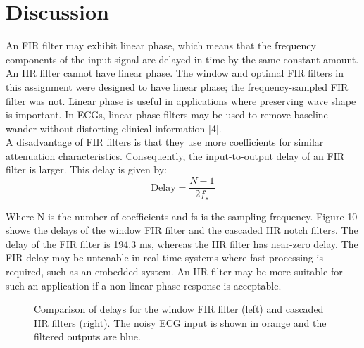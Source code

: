 \documentclass[12pt]{article}
\begin{document}
\section{Discussion}
An FIR filter may exhibit linear phase, which means that the frequency components of the input signal are delayed 
in time by the same constant amount. An IIR filter cannot have linear phase. The window and optimal FIR filters
in this assignment were designed to have linear phase; the frequency-sampled FIR filter was not. Linear phase is
useful in applications where preserving wave shape is important. In ECGs, linear phase filters may be used to remove
baseline wander without distorting clinical information [4].\\

\noindent A disadvantage of FIR filters is that they use more coefficients for similar attenuation characteristics.
Consequently, the input-to-output delay of an FIR filter is larger. This delay is given by:
\begin{equation}
    \textrm{Delay} = \frac{N-1}{2f_s}
\end{equation}

\noindent Where N is the number of coefficients and fs is the sampling frequency. Figure 10 shows the delays of the window
FIR filter and the cascaded IIR notch filters. The delay of the FIR filter is 194.3 ms, whereas the IIR filter has
near-zero delay. The FIR delay may be untenable in real-time systems where fast processing is required, such as an
embedded system. An IIR filter may be more suitable for such an application if a non-linear phase response is acceptable.\\

\begin{figure}[H]
    \begin{subfigure}{0.5\textwidth}
        \resizebox{\linewidth}{!}{}
    \end{subfigure}
    \begin{subfigure}{0.5\textwidth}
        \resizebox{\linewidth}{!}{}
    \end{subfigure}
    \caption{Comparison of delays for the window FIR filter (left) and cascaded IIR filters (right). The noisy ECG input is shown in orange and the filtered outputs are blue.}
\end{figure}
\end{document}
